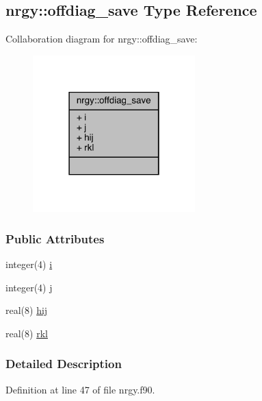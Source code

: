 \hypertarget{structnrgy_1_1offdiag__save}{\subsection{nrgy\-:\-:offdiag\-\_\-save Type Reference}
\label{structnrgy_1_1offdiag__save}
}


Collaboration diagram for nrgy\-:\-:offdiag\-\_\-save\-:
\nopagebreak
\begin{figure}[H]
\begin{center}
\leavevmode
\includegraphics[width=178pt]{structnrgy_1_1offdiag__save__coll__graph}
\end{center}
\end{figure}
\subsubsection*{Public Attributes}
\begin{DoxyCompactItemize}
\item 
integer(4) \hyperlink{structnrgy_1_1offdiag__save_a84c94de2228adadf40187a2c584c8896}{i}
\item 
integer(4) \hyperlink{structnrgy_1_1offdiag__save_a8efa92d13904284eeed8fdcaecb274bf}{j}
\item 
real(8) \hyperlink{structnrgy_1_1offdiag__save_a139b09d298932bc09f98634b00c70463}{hij}
\item 
real(8) \hyperlink{structnrgy_1_1offdiag__save_a839509e8e53fa8d03de15f252066f7e5}{rkl}
\end{DoxyCompactItemize}


\subsubsection{Detailed Description}


Definition at line 47 of file nrgy.\-f90.



